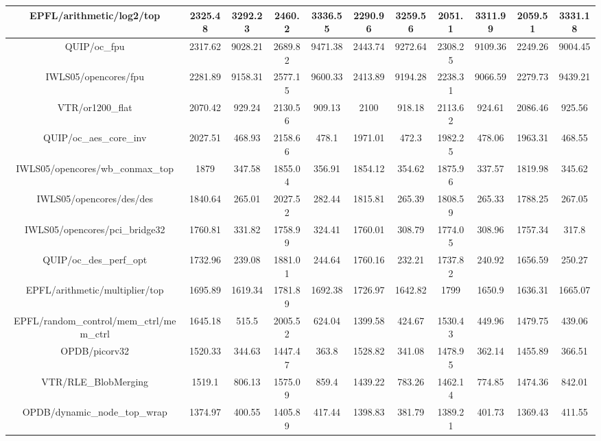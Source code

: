 {\begin{longtable}{|*{11}{c|}}
        EPFL/arithmetic/log2/top & 2325.48 & 3292.23 & 2460.2 & 3336.55 & 2290.96 & 3259.56 & 2051.1 & 3311.99 & 2059.51 & 3331.18 \\
        \hline
        QUIP/oc\_fpu & 2317.62 & 9028.21 & 2689.82 & 9471.38 & 2443.74 & 9272.64 & 2308.25 & 9109.36 & 2249.26 & 9004.45 \\
        \hline
        IWLS05/opencores/fpu & 2281.89 & 9158.31 & 2577.15 & 9600.33 & 2413.89 & 9194.28 & 2238.31 & 9066.59 & 2279.73 & 9439.21 \\
        \hline
        VTR/or1200\_flat & 2070.42 & 929.24 & 2130.56 & 909.13 & 2100 & 918.18 & 2113.62 & 924.61 & 2086.46 & 925.56 \\
        \hline
        QUIP/oc\_aes\_core\_inv & 2027.51 & 468.93 & 2158.66 & 478.1 & 1971.01 & 472.3 & 1982.25 & 478.06 & 1963.31 & 468.55 \\
        \hline
        IWLS05/opencores/wb\_conmax\_top & 1879 & 347.58 & 1855.04 & 356.91 & 1854.12 & 354.62 & 1875.96 & 337.57 & 1819.98 & 345.62 \\
        \hline
        IWLS05/opencores/des/des & 1840.64 & 265.01 & 2027.52 & 282.44 & 1815.81 & 265.39 & 1808.59 & 265.33 & 1788.25 & 267.05 \\
        \hline
        IWLS05/opencores/pci\_bridge32 & 1760.81 & 331.82 & 1758.99 & 324.41 & 1760.01 & 308.79 & 1774.05 & 308.96 & 1757.34 & 317.8 \\
        \hline
        QUIP/oc\_des\_perf\_opt & 1732.96 & 239.08 & 1881.01 & 244.64 & 1760.16 & 232.21 & 1737.82 & 240.92 & 1656.59 & 250.27 \\
        \hline
        EPFL/arithmetic/multiplier/top & 1695.89 & 1619.34 & 1781.89 & 1692.38 & 1726.97 & 1642.82 & 1799 & 1650.9 & 1636.31 & 1665.07 \\
        \hline
        EPFL/random\_control/mem\_ctrl/mem\_ctrl & 1645.18 & 515.5 & 2005.52 & 624.04 & 1399.58 & 424.67 & 1530.43 & 449.96 & 1479.75 & 439.06 \\
        \hline
        OPDB/picorv32 & 1520.33 & 344.63 & 1447.47 & 363.8 & 1528.82 & 341.08 & 1478.95 & 362.14 & 1455.89 & 366.51 \\
        \hline
        VTR/RLE\_BlobMerging & 1519.1 & 806.13 & 1575.09 & 859.4 & 1439.22 & 783.26 & 1462.14 & 774.85 & 1474.36 & 842.01 \\
        \hline
        OPDB/dynamic\_node\_top\_wrap & 1374.97 & 400.55 & 1405.89 & 417.44 & 1398.83 & 381.79 & 1389.21 & 401.73 & 1369.43 & 411.55 \\
        \hline

\end{longtable}}
